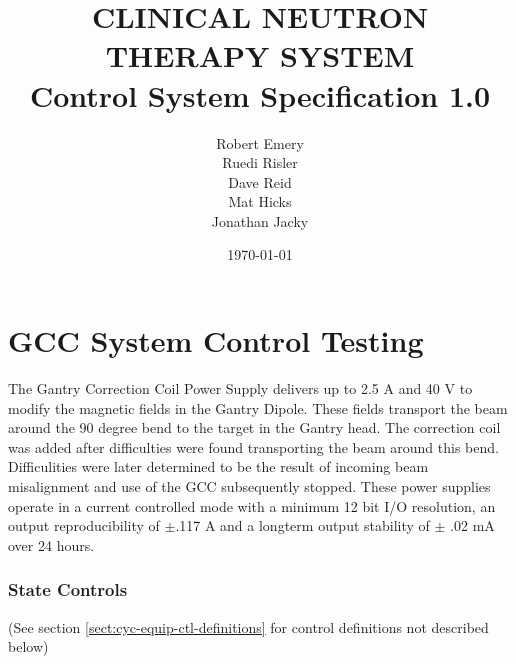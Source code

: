 \documentclass[11pt]{book}		%
\title{CLINICAL NEUTRON THERAPY SYSTEM\\
	Control System Specification 1.0\\[1.0cm]}
\author{Robert Emery\\
	Ruedi Risler\\
	Dave Reid \\
	Mat Hicks \\
        Jonathan Jacky}
\date{\today}
\begin{document}
\chapter{GCC System Control Testing}

The Gantry Correction Coil Power Supply delivers up to 2.5 A and 40 V to modify the magnetic fields in the Gantry Dipole. These fields transport the beam around the 90 degree bend to the target in the Gantry head. The correction coil was added after difficulties were found transporting the beam around this bend. Difficulities were later determined to be the result of incoming beam misalignment and use of the GCC subsequently stopped.  These power supplies operate in a current controlled mode with a minimum 12 bit I/O resolution, an output reproducibility of $\pm$.117 A and a longterm output stability of $\pm$ .02 mA over 24 hours.

\subsection{State Controls} \label{sect:cyc-equip-ctl-beamline-gcc-state-controls}
(See section \ref{sect:cyc-equip-ctl-definitions} for control definitions not described below)
\end{document}

